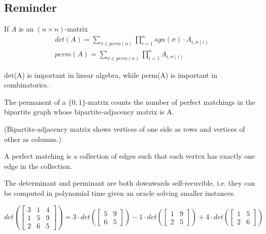 \documentclass[a4paper,12pt]{article}
\theoremstyle{definition}
\theoremstyle{remark}
\begin{document}
\subsection*{Reminder}
If $A$ is an $(n \times n)$-matrix
\begin{gather*}
    det(A) = \sum_{\sigma \in perm(n)} \prod_{i = 1}^{n} sgn(\sigma) \cdot A_{i, \sigma(i)} \\
    perm(A) = \sum_{\sigma \in perm(n)} \prod_{i = 1}^{n} A_{i, \sigma(i)}
\end{gather*}

det(A) is important in linear algebra, while perm(A) is important in combinatorics.

The permanent of a $\{0, 1\}$-matrix counts the number of perfect matchings in the bipartite graph whose bipartite-adjacency matrix is A.

(Bipartite-adjacency matrix shows vertices of one side as rows and vertices of other as columns.)

A perfect matching is a collection of edges such that each vertex has exactly one edge in the collection.

The determinant and perminant are both downwards self-recuvible, i.e. they can be computed in polynomial time
given an oracle solving smaller instances.

\begin{equation*}
    det(\begin{bmatrix}
        3 & 1 & 4 \\
        1 & 5 & 9 \\
        2 & 6 & 5
    \end{bmatrix})
    =
    3 \cdot det(\begin{bmatrix}
        5 & 9 \\
        6 & 5
    \end{bmatrix}) 
    - 1 \cdot det(\begin{bmatrix}
        1 & 9 \\
        2 & 5
    \end{bmatrix})
    + 4 \cdot det(\begin{bmatrix}
        1 & 5 \\
        2 & 6
    \end{bmatrix})
\end{equation*}
\end{document}
